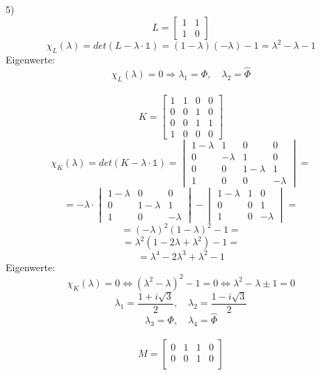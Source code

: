 \begin{paragraph}{5)}
  \[ L = \begin{bmatrix} 1 & 1 \\ 1 & 0 \end{bmatrix} \]
  \[ \chi_L(\lambda) = det(L - \lambda \cdot \mathds{1}) 
     = (1 - \lambda)(-\lambda) - 1 = \lambda^2 - \lambda - 1 \]
  Eigenwerte:
  \[ \chi_L(\lambda) = 0 \Rightarrow \lambda_1 
     = \Phi, \quad \lambda_2 = \hat \Phi \] \\[2em]
  \[ K = \begin{bmatrix} 1 & 1 & 0 & 0 \\ 0 & 0 & 1 & 0 \\
                         0 & 0 & 1 & 1 \\ 1 & 0 & 0 & 0 \end{bmatrix} \]
  \[ \chi_K(\lambda) = det(K - \lambda \cdot \mathds{1})
     = \begin{vmatrix} 1-\lambda & 1 & 0 & 0 \\
                       0 & -\lambda & 1 & 0 \\
                       0 & 0 & 1-\lambda & 1 \\
                       1 & 0 & 0 & -\lambda \end{vmatrix} = \]
  \[ = -\lambda \cdot \begin{vmatrix} 1-\lambda & 0 & 0 \\ 
                                      0 & 1-\lambda & 1 \\
                                      1 & 0 & -\lambda \end{vmatrix} -
                      \begin{vmatrix} 1-\lambda & 1 & 0 \\
                                      0 & 0 & 1 \\
                                      1 & 0 & -\lambda \end{vmatrix} = \]
  \[ = (-\lambda)^2 (1-\lambda)^2 - 1 = \]
  \[ = \lambda^2 (1 - 2\lambda + \lambda^2) - 1 = \]
  \[ = \lambda^4 - 2\lambda^3 +\lambda^2 - 1 \]
  Eigenwerte:
  \[ \chi_K(\lambda) = 0 \Leftrightarrow (\lambda^2 - \lambda)^2 - 1 
     = 0 \Leftrightarrow \lambda^2 - \lambda \pm 1 = 0 \]
  \[ \lambda_1 = \frac{1 + i\sqrt{3}}{2}, \quad
     \lambda_2 = \frac{1 - i\sqrt{3}}{2} \]
  \[ \lambda_3 = \Phi, \quad \lambda_4 = \hat \Phi \] \\[2em]
  \[ M = \begin{bmatrix} 0 & 1 & 1 & 0 \\ 0 & 0 & 1 & 0 \\

\end{bmatrix}\]
\end{paragraph}

